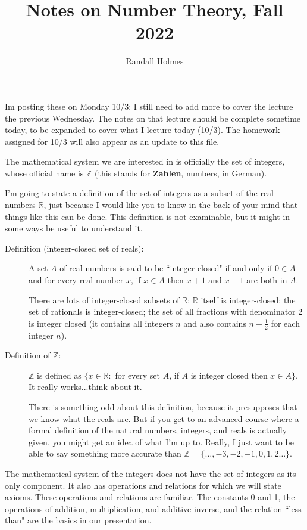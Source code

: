 \documentclass[12pt]{article}
\title{Notes on Number Theory, Fall 2022}
\author{Randall Holmes}
\begin{document}
\maketitle

Im posting these on Monday 10/3;  I still need to add more to cover the lecture the previous Wednesday.  The notes
on that lecture should be complete sometime today, to be expanded to cover what I lecture today (10/3).  The homework assigned for 10/3 will also appear as an update to this file.

The mathematical system we are interested in is officially the set of integers, whose official name is $\mathbb Z$ (this stands for {\bf Zahlen}, numbers, in German).

I'm going to state a definition of the set of integers as a subset of the real numbers $\mathbb R$, just because I would like you to know in the back of your mind that things like this can be done.  This definition is not examinable, but it might in some ways be useful to understand it.

\begin{description}

\item[Definition (integer-closed set of reals):]  A set $A$ of real numbers is said to be ``integer-closed" if and only if $0 \in A$ and for every real number $x$, if $x \in A$ then $x+1$ and $x-1$ are both in $A$.

There are lots of integer-closed subsets of $\mathbb R$:  $\mathbb R$ itself is integer-closed;  the set of rationals is integer-closed; the set of all fractions with denominator 2 is integer closed (it contains all integers $n$ and also contains $n + \frac 12$ for each integer $n$).

\item[Definition of $\mathbb Z$:]  $\mathbb Z$ is defined as $\{x \in \mathbb R:$ for every set $A$, if $A$ is integer closed then $x \in A\}$.  It really works...think about it.

There is something odd about this definition, because it presupposes that we know what the reals are.  But if you get to an advanced course where a formal definition of the natural numbers, integers, and reals is actually given, you might get an idea of what I'm up to.  Really, I just want to be able to say something more accurate than $\mathbb Z = \{\ldots,-3,-2,-1,0,1,2\ldots\}$.

\end{description}

The mathematical system of the integers does not have the set of integers as its only component.  It also has operations and relations for which we will state axioms.  These operations and relations are familiar.  The constants 0 and 1, the operations of addition, multiplication, and additive inverse, and the relation ``less than" are the basics in our presentation.
\end{document}
